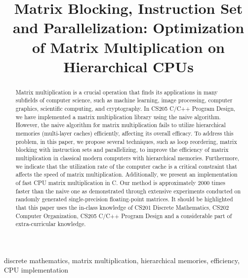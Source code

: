 \documentclass[conference]{IEEEtran}
\begin{document}
	
	\title{Matrix Blocking, Instruction Set and Parallelization: Optimization of Matrix Multiplication on Hierarchical CPUs}
	\author{
	}
	
	\maketitle \thispagestyle{plain}
	\setcounter{page}{1}
	\pagestyle{plain}

	\begin{abstract}
		Matrix multiplication is a crucial operation that finds its applications in many subfields of computer science, 
		such as machine learning, image processing, computer graphics, scientific computing, and cryptography. 
		In CS205 C/C++ Program Design, we have implemented a matrix multiplication library using the naive algorithm. 
		However, the naive algorithm for matrix multiplication fails to utilize hierarchical memories (multi-layer caches) efficiently, 
		affecting its overall efficacy. 
		To address this problem, in this paper, we propose several techniques, such as loop reordering, matrix blocking with instruction 
		sets and parallelizing, to improve the efficiency of matrix multiplication in classical modern computers with hierarchical memories. 
		Furthermore, we indicate that the utilization rate of the computer cache is a critical constraint that affects the speed of matrix 
		multiplication. 
		Additionally, we present an implementation of fast CPU matrix multiplication in C. 
		Our method is approximately 2000 times faster than the naive one as demonstrated through extensive 
		experiments conducted on randomly generated single-precision floating-point matrices.
		It should be highlighted that this paper uses the in-class knowledge of CS201 Discrete Mathematics, CS202 Computer Organization, CS205 C/C++ Program Design and a considerable part of extra-curricular knowledge.	\end{abstract}
	
	\begin{IEEEkeywords}
		discrete mathematics, matrix multiplication, hierarchical memories, efficiency, CPU implementation
	\end{IEEEkeywords}
	
\end{document}
